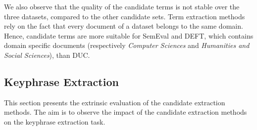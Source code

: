       We also observe that the quality of the candidate terms is not stable over
      the three datasets, compared to the other candidate sets. Term extraction
      methods rely on the fact that every document of a dataset belongs to the
      same domain. Hence, candidate terms are more suitable for SemEval and
      DEFT, which contains domain specific documents (respectively
      \textit{Computer Sciences} and \textit{Humanities and Social Sciences}),
      than DUC.

  \subsection{Keyphrase Extraction}
  \label{subsec:keyphrase_extraction}
    This section presents the extrinsic evaluation of the candidate extraction
    methods. The aim is to observe the impact of the candidate extraction
    methods on the keyphrase extraction task.

